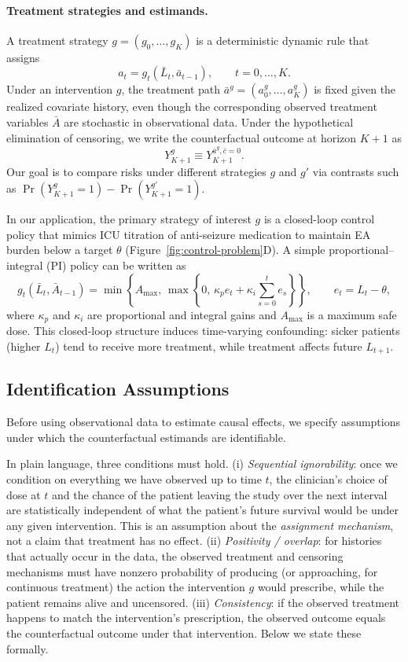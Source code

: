 \paragraph{Treatment strategies and estimands.}
A treatment strategy $g=(g_0,\ldots,g_K)$ is a deterministic dynamic rule that assigns
\[
a_t = g_t(\bar L_t,\bar a_{t-1}), \qquad t=0,\ldots,K.
\]
Under an intervention $g$, the treatment path $\bar a^g=(a_0^g,\ldots,a_K^g)$ is fixed
given the realized covariate history, even though the corresponding observed treatment
variables $\bar A$ are stochastic in observational data. Under the hypothetical
elimination of censoring, we write the counterfactual outcome at horizon $K+1$ as
\[
Y^g_{K+1} \equiv Y^{\bar a^g,\bar c=0}_{K+1}.
\]
Our goal is to compare risks under different strategies $g$ and $g'$ via contrasts such
as $\Pr(Y^g_{K+1}=1)-\Pr(Y^{g'}_{K+1}=1)$.

In our application, the primary strategy of interest $g$ is a closed-loop control policy
that mimics ICU titration of anti-seizure medication to maintain EA burden below a
target $\theta$ (Figure~\ref{fig:control-problem}D). A simple proportional--integral (PI)
policy can be written as
\begin{equation}
g_t(\bar L_t,\bar A_{t-1})
=
\min\!\left\{A_{\max},\,
\max\!\left\{0,\, \kappa_p e_t + \kappa_i \sum_{s=0}^{t} e_s \right\}\right\},
\qquad e_t = L_t-\theta,
\end{equation}
where $\kappa_p$ and $\kappa_i$ are proportional and integral gains and $A_{\max}$ is a
maximum safe dose. This closed-loop structure induces time-varying confounding: sicker
patients (higher $L_t$) tend to receive more treatment, while treatment affects future
$L_{t+1}$.

\subsection{Identification Assumptions}

Before using observational data to estimate causal effects, we specify assumptions under
which the counterfactual estimands are identifiable.

In plain language, three conditions must hold. (i) \emph{Sequential ignorability}: once we
condition on everything we have observed up to time $t$, the clinician's choice of dose at
$t$ and the chance of the patient leaving the study over the next interval are statistically
independent of what the patient's future survival would be under any given intervention.
This is an assumption about the \emph{assignment mechanism}, not a claim that treatment has
no effect. (ii) \emph{Positivity / overlap}: for histories that actually occur in the data,
the observed treatment and censoring mechanisms must have nonzero probability of producing
(or approaching, for continuous treatment) the action the intervention \(g\) would prescribe,
while the patient remains alive and uncensored. (iii) \emph{Consistency}: if the observed
treatment happens to match the intervention's prescription, the observed outcome equals the
counterfactual outcome under that intervention. Below we state these formally.

